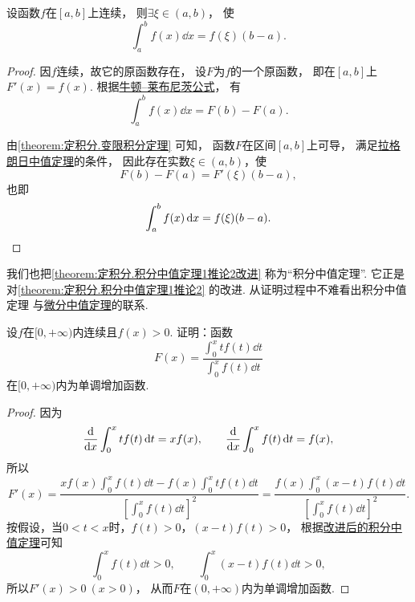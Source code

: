 \begin{proposition}\label{theorem:定积分.积分中值定理1推论2改进}
设函数\(f\)在\([a,b]\)上连续，
则\(\exists\xi\in(a,b)\)，
使\[
	\int_a^b f(x) \dd{x} = f(\xi) (b-a).
\]
\begin{proof}
因\(f\)连续，故它的原函数存在，
设\(F\)为\(f\)的一个原函数，
即在\([a,b]\)上\(F'(x) = f(x)\).
根据\hyperref[equation:定积分.牛顿--莱布尼茨公式]{牛顿--莱布尼茨公式}，
有\[
	\int_a^b f(x) \dd{x}
	= F(b) - F(a).
\]

由\cref{theorem:定积分.变限积分定理} 可知，
函数\(F\)在区间\([a,b]\)上可导，
满足\hyperref[theorem:微分中值定理.拉格朗日中值定理]{拉格朗日中值定理}的条件，
因此存在实数\(\xi\in(a,b)\)，使\[
	F(b) - F(a) = F'(\xi) (b-a),
\]
也即\[
	\int_a^b f(x) \dd{x} = f(\xi) (b-a).
	\qedhere
\]
\end{proof}
\end{proposition}
\begin{remark}
我们也把\cref{theorem:定积分.积分中值定理1推论2改进} 称为“积分中值定理”.
它正是对\cref{theorem:定积分.积分中值定理1推论2} 的改进.
从证明过程中不难看出积分中值定理
与\hyperref[theorem:微分中值定理.拉格朗日中值定理]{微分中值定理}的联系.
\end{remark}

\begin{example}
\def\fu{\displaystyle \int_0^x t f(t) \dd{t}}
\def\fv{\displaystyle \int_0^x f(t) \dd{t}}
\def\fvv{\left[ \fv \right]^2}
\def\fw{\displaystyle \int_0^x (x-t) f(t) \dd{t}}
设\(f\)在\([0,+\infty)\)内连续且\(f(x) > 0\).
证明：函数\[
	F(x) = \frac{\fu}{\fv}
\]在\([0,+\infty)\)内为单调增加函数.
\begin{proof}
因为\[
	\dv{x} \fu = x f(x),
	\qquad
	\dv{x} \fv = f(x),
\]
所以\[
	F'(x) = \frac{x f(x) \fv - f(x) \fu}{\fvv}
	= \frac{f(x) \fw}{\fvv}.
\]
按假设，当\(0 < t < x\)时，\(f(t) > 0\)，\((x-t) f(t) > 0\)，
根据\hyperref[theorem:定积分.积分中值定理1推论2改进]{改进后的积分中值定理}可知\[
	\fv > 0, \qquad \fw > 0,
\]
所以\(F'(x) > 0\ (x > 0)\)，
从而\(F\)在\((0,+\infty)\)内为单调增加函数.
\end{proof}
\end{example}

